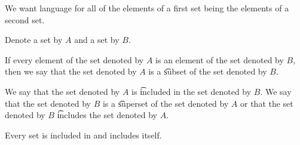 

We want language for all of the elements of a first set being the elements of a second set.


Denote a set by $A$ and a set by $B$.

\begin{definition}%
If every element of the set denoted by $A$ is an element of the set denoted by $B$, then we say that the set denoted by $A$ is a \t{subset} of the set denoted by $B$.
\label{set_inclusion:subsets}
\end{definition}

We say that the set denoted by $A$ is \t{included} in the set denoted by $B$.
We say that the set denoted by $B$ is a \t{superset} of the set denoted by $A$ or that the set denoted by $B$ \t{includes} the set denoted by $A$.

Every set is included in and includes itself.
\begin{account}
\end{account}

%
%
%

